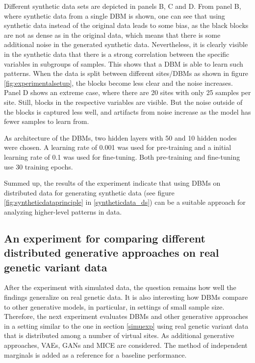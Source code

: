 \documentclass[12pt]{article}
\begin{document}
Different synthetic data sets are depicted in panels B, C and D.
From panel B, where synthetic data from a single DBM is shown, one can see that using synthetic data instead of the original data leads to some bias, as the black blocks are not as dense as in the original data, which means that there is some additional noise in the generated synthetic data.
Nevertheless, it is clearly visible in the synthetic data that there is a strong correlation between the specific variables in subgroups of samples.
This shows that a DBM is able to learn such patterns.
When the data is split between different sites/DBMs as shown in figure \ref{fig:experimentalsetup}, the blocks become less clear and the noise increases.
Panel D shows an extreme case, where there are 20 sites with only 25 samples per site.
Still, blocks in the respective variables are visible.
But the noise outside of the blocks is captured less well, and artifacts from noise increase as the model has fewer samples to learn from.

As architecture of the DBMs, two hidden layers with 50 and 10 hidden nodes were chosen. 
A learning rate of 0.001 was used for pre-training and a initial learning rate of 0.1 was used for fine-tuning.
Both pre-training and fine-tuning use 30 training epochs.
 
Summed up, the results of the experiment indicate that using DBMs on distributed data for generating synthetic data (see figure \ref{fig:syntheticdataprinciple} in \ref{syntheticdata_ds}) can be a suitable approach for analyzing higher-level patterns in data.
 
\FloatBarrier
\subsection{An experiment for comparing different distributed generative approaches on real genetic variant data}

After the experiment with simulated data, the question remains how well the findings generalize on real genetic data.
It is also interesting how DBMs compare to other generative models, in particular, in settings of small sample size.
Therefore, the next experiment evaluates DBMs and other generative approaches in a setting similar to the one in section \ref{simuexp} using real genetic variant data that is distributed among a number of virtual sites.
As additional generative approaches, VAEs, GANs and MICE are considered.
The method of independent marginals is added as a reference for a baseline performance.
\end{document}
